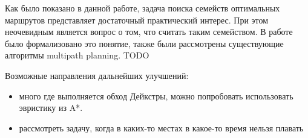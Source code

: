 \startconclusionpage

Как было показано в данной работе, задача поиска семейств оптимальных
маршрутов представляет достаточный практический интерес. При этом
неочевидным является вопрос о том, что считать таким семейством. В
работе было формализовано это понятие, также были рассмотрены
существующие алгоритмы multipath planning. TODO

Возможные направления дальнейших улучшений:
\begin{itemize}
    \item много где выполняется обход Дейкстры, можно попробовать
    использовать эвристику из A*.
    \item рассмотреть задачу, когда в каких-то местах в какое-то время
    нельзя плавать
\end{itemize}

\FloatBarrier
